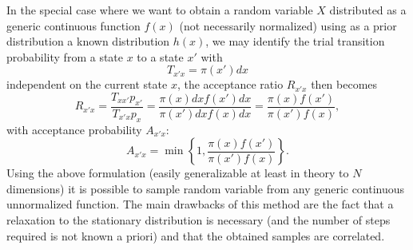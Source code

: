 In the special case where we want to obtain a random variable $X$ distributed as a generic continuous function $f(x)$ (not necessarily 
normalized) using as a prior distribution a known distribution $h(x)$, we may identify the trial transition probability from a state $x$ to 
a state $x'$ with
\begin{equation}
    T_{x'x}=\pi(x')dx
\end{equation}
independent on the current state $x$, the acceptance ratio $R_{x'x}$ then becomes
\begin{equation}
    R_{x'x}=\frac{T_{xx'}p_{x'}}{T_{x'x}p_{x}}=\frac{\pi(x)dxf(x')dx}{\pi(x')dxf(x)dx}=\frac{\pi(x)f(x')}{\pi(x')f(x)},
    \label{metropolis-hastings-continuous}
\end{equation}
with acceptance probability $A_{x'x}$:
\begin{equation}
    A_{x'x}=\min{\left\{1,\frac{\pi(x)f(x')}{\pi(x')f(x)}\right\}}.
    \label{acceptance_prob_distrib}
\end{equation}
Using the above formulation (easily generalizable at least in theory to $N$ dimensions) it is possible to sample random variable from any generic continuous 
unnormalized function. The main drawbacks of this method are the fact that a relaxation to the stationary distribution is necessary (and the number of steps required is 
not known a priori) and that the obtained samples are correlated.
